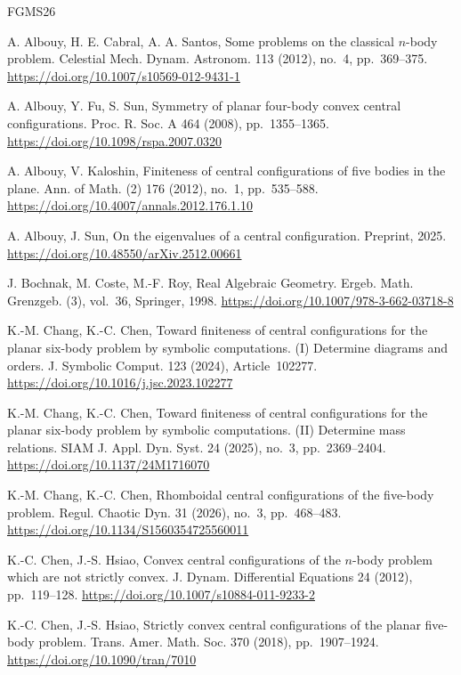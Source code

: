 \documentclass[Threeside,11pt]{article}
\theoremstyle{definition}
\theoremstyle{remark}
\numberwithin{equation}{section}
\theoremstyle{remark}
\begin{document}
\begin{thebibliography}{FGMS26}

A. Albouy, H. E. Cabral, A. A. Santos,
Some problems on the classical $n$-body problem.
Celestial Mech. Dynam. Astronom. 113 (2012), no.~4, pp.~369--375.
\url{https://doi.org/10.1007/s10569-012-9431-1}

A. Albouy, Y. Fu, S. Sun,
Symmetry of planar four-body convex central configurations.
Proc. R. Soc. A 464 (2008), pp.~1355--1365.
\url{https://doi.org/10.1098/rspa.2007.0320}

A. Albouy, V. Kaloshin,
Finiteness of central configurations of five bodies in the
plane.
Ann. of Math. (2) 176 (2012), no.~1, pp.~535--588.
\url{https://doi.org/10.4007/annals.2012.176.1.10}

A. Albouy, J. Sun,
On the eigenvalues of a central configuration.
Preprint, 2025.
\url{https://doi.org/10.48550/arXiv.2512.00661}

J. Bochnak, M. Coste, M.-F. Roy,
Real Algebraic Geometry.
Ergeb. Math. Grenzgeb. (3), vol.~36, Springer, 1998.
\url{https://doi.org/10.1007/978-3-662-03718-8}

K.-M. Chang, K.-C. Chen,
Toward finiteness of central configurations for the planar
six-body problem by symbolic computations. (I) Determine diagrams and orders.
J. Symbolic Comput. 123 (2024), Article~102277.
\url{https://doi.org/10.1016/j.jsc.2023.102277}

K.-M. Chang, K.-C. Chen,
Toward finiteness of central configurations for the planar
six-body problem by symbolic computations. (II) Determine mass relations.
SIAM J. Appl. Dyn. Syst. 24 (2025), no.~3, pp.~2369--2404.
\url{https://doi.org/10.1137/24M1716070}

K.-M. Chang, K.-C. Chen,
Rhomboidal central configurations of the five-body problem.
Regul. Chaotic Dyn. 31 (2026), no.~3, pp.~468--483.
\url{https://doi.org/10.1134/S1560354725560011}

K.-C. Chen, J.-S. Hsiao,
Convex central configurations of the $n$-body problem which are not strictly convex.
J. Dynam. Differential Equations 24 (2012), pp.~119--128.
\url{https://doi.org/10.1007/s10884-011-9233-2}

K.-C. Chen, J.-S. Hsiao,
Strictly convex central configurations of the planar five-body problem.
Trans. Amer. Math. Soc. 370 (2018), pp.~1907--1924.
\url{https://doi.org/10.1090/tran/7010}


\end{thebibliography}
\end{document}
